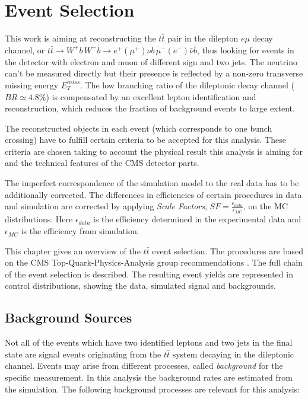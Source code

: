 \chapter{Event Selection}\label{chapt:event_sel}
 
This work is aiming at reconstructing the $t\bar{t}$ pair in the dilepton $e\mu$ decay channel, or
$t\bar{t} \to W^{+}b\,W^{-}\bar{b} \to e^{+}(\mu^{+})\nu b\,\mu^{-}(e^{-})\bar{\nu}\bar{b}$, thus 
looking for events in the detector with electron and muon of different sign and two jets. The 
neutrino can't be measured directly but their presence is reflected by a non-zero transverse
missing energy $E_{T}^{miss}$. The low branching ratio of the dileptonic decay channel
($BR \simeq 4.8\%$) is compensated by an excellent lepton identification and reconstruction, 
which reduces the fraction of background events to large extent.

The reconstructed objects in each event (which corresponds to one bunch crossing) have to fulfill certain 
criteria to be accepted for this analysis. These criteria are chosen taking to account the physical 
result this analysis is aiming for and the technical features of the CMS detector parts.

The imperfect correspondence of the simulation model to the real data has to be additionally 
corrected. The differences in efficiencies of certain procedures in data and simulation 
are corrected by applying \textit{Scale Factors}, $SF = \frac{\epsilon_{data}}{\epsilon_{MC}}$, 
on the MC distributions. Here $\epsilon_{data}$ is the efficiency determined in the experimental 
data and $\epsilon_{MC}$ is the efficiency from simulation. 

This chapter gives an overview of the $t\bar{t}$ event selection. The 
procedures are based on the CMS Top-Quark-Physics-Analysis group recommendations \cite{TopPAGreco}.
The full chain of the event selection is described. 
The resulting event yields are represented in control distributions, showing the data, simulated signal and backgrounds.

\section{Background Sources}\label{sec:bg_intro}

Not all of the events which have two identified leptons and two jets in the final state are signal events
originating from the $t\bar{t}$ system decaying in the dileptonic channel. Events may arise from different processes, 
called \textit{background} for the specific measurement. In this analysis the background rates are estimated 
from the simulation. The following background processes are relevant for this analysis:

